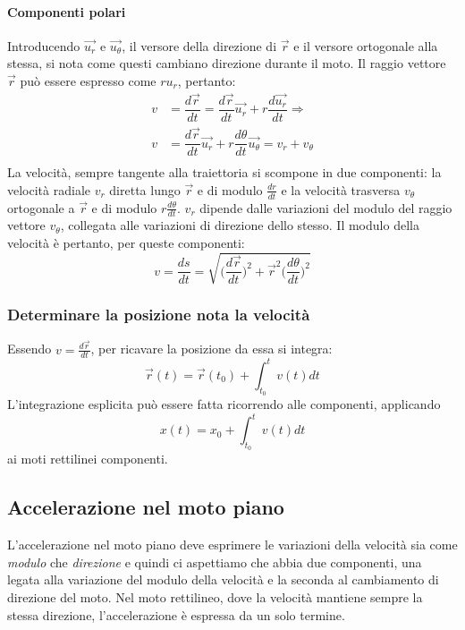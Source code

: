 \documentclass[class=book, crop=false, oneside, 12pt]{standalone}
\begin{document}
			\paragraph{Componenti polari}
      Introducendo $\overrightarrow{u_r}$ e $\overrightarrow{u_\theta}$, il versore della direzione di $\overrightarrow{r}$ e il versore ortogonale alla stessa, si nota come questi cambiano direzione durante il moto.
      Il raggio vettore $\overrightarrow{r}$ pu\`o essere espresso come $ru_r$, pertanto:
			\begin{align*}
        v&=\dfrac{d\overrightarrow{r}}{dt}=\dfrac{d\overrightarrow{r}}{dt}\overrightarrow{u_r}+r\dfrac{d\overrightarrow{u_r}}{dt}\Rightarrow\\
        v&=\dfrac{d\overrightarrow{r}}{dt}\overrightarrow{u_r}+r\dfrac{d\theta}{dt}\overrightarrow{u_\theta}=v_r+v_\theta\\
			\end{align*}
      La velocit\`a, sempre tangente alla traiettoria si scompone in due componenti: la velocit\`a radiale $v_r$ diretta lungo $\overrightarrow{r}$ e di modulo $\frac{dr}{dt}$ e la velocit\`a trasversa $v_\theta$ ortogonale a $\overrightarrow{r}$ e di modulo $r\frac{d\theta}{dt}$.
			$v_r$ dipende dalle variazioni del modulo del raggio vettore $v_\theta$, collegata alle variazioni di direzione dello stesso.
			Il modulo della velocit\`a \`e pertanto, per queste componenti:
      $$v=\dfrac{ds}{dt}=\sqrt{\biggl(\dfrac{d\overrightarrow{r}}{dt}\biggr)^2+\overrightarrow{r}^2\biggl(\dfrac{d\theta}{dt}\biggr)^2}$$
		\subsubsection{Determinare la posizione nota la velocit\`a}
    Essendo $v=\frac{d\overrightarrow{r}}{dt}$, per ricavare la posizione da essa si integra:
    $$\overrightarrow{r}(t)=\overrightarrow{r}(t_0)+\int_{t_0}^tv(t)dt$$
		L'integrazione esplicita pu\`o essere fatta ricorrendo alle componenti, applicando
		$$x(t)=x_0+\int_{t_0}^tv(t)dt$$
		ai moti rettilinei componenti.
  \subsection{Accelerazione nel moto piano}
  L'accelerazione nel moto piano deve esprimere le variazioni della velocità sia come \emph{modulo} che \emph{direzione} e quindi ci aspettiamo che abbia due componenti,
  una legata alla variazione del modulo della velocità e la seconda al cambiamento di direzione del moto.
  Nel moto rettilineo, dove la velocità mantiene sempre la stessa direzione, l'accelerazione è espressa da un solo termine.
\end{document}
